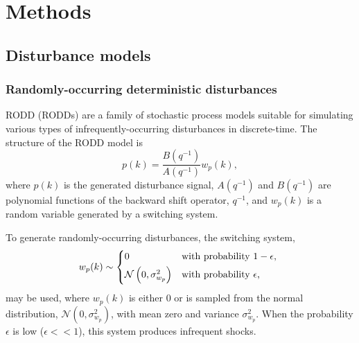 \chapter{Methods}
\label{chap-methods}

\section{Disturbance models}

\subsection{Randomly-occurring deterministic disturbances} \label{sec:RODD}

\Acrlong{RODD} (\acrshort{RODD}s) \citep{macgregor_duality_1984} are a family of stochastic process models suitable for simulating various types of infrequently-occurring disturbances in discrete-time.  The structure of the \gls{RODD} model is
\begin{equation} \label{eq:RODD}
	p(k) = \frac{B(q^{-1})}{A(q^{-1})} w_p(k),
\end{equation}
where $p(k)$ is the generated disturbance signal, $A(q^{-1})$ and $B(q^{-1})$ are polynomial functions of the backward shift operator, $q^{-1}$, and $w_p(k)$ is a random variable generated by a switching system.
%
%
%
%
%

To generate randomly-occurring disturbances, the switching system,
\begin{equation} \label{eq:wpk1} 
	w_p(k) \sim 
	\begin{cases*}
		0 & with probability $1-\epsilon$, \\
		\mathcal{N}\left( 0, \sigma_{w_p}^2 \right) & with probability $\epsilon$,
	\end{cases*}
\end{equation}
%
may be used, where $w_p(k)$ is either 0 or is sampled from the normal distribution, $\mathcal{N}(0,\sigma_{w_p}^2)$, with mean zero and variance $\sigma_{w_p}^2$.  When the probability $\epsilon$ is low ($\epsilon<<1$), this system produces infrequent shocks.
%

